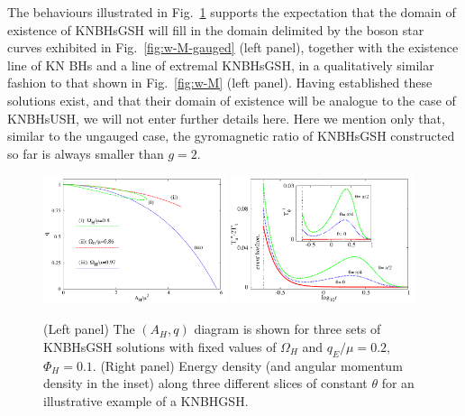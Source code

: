The behaviours illustrated in Fig.~\ref{fig:q-AH-gauged} supports the expectation that the domain of existence of KNBHsGSH will fill in the domain delimited by the boson star curves exhibited in Fig.~\ref{fig:w-M-gauged} (left panel), together with the existence line of KN BHs and a line of extremal KNBHsGSH,  in a qualitatively similar fashion to that shown in Fig.~\ref{fig:w-M} (left panel). Having established these solutions exist, and that their domain of existence will be analogue to the case of KNBHsUSH, we will not enter further details here.
Here we mention only that, similar to the ungauged case, 
the gyromagnetic ratio of  KNBHsGSH constructed so far is always smaller than $g=2$.


\begin{figure}[H]
  \begin{center}
    \includegraphics[width=0.48\textwidth]{papers/KerrNewman/BH-q-AH} 
    \includegraphics[width=0.48\textwidth]{papers/KerrNewman/energy-2d} 
  \end{center}
  \caption{ (Left panel) 
	The $(A_H,q)$ diagram is shown for three sets of KNBHsGSH solutions with fixed values of 
$\Omega_H$ and 
$q_E/\mu=0.2$, 
$\Phi_H=0.1$. (Right panel) 
 Energy density (and angular momentum density in the inset) along three different slices of constant $\theta$ for an illustrative example of a KNBHGSH.
	}
  \label{fig:q-AH-gauged}
\end{figure}
 



